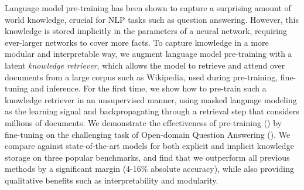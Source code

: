 Language model pre-training has been shown to capture a surprising amount of world knowledge, crucial for NLP tasks such as question answering. However, this knowledge is stored implicitly in the parameters of a neural network, requiring ever-larger networks to cover more facts.
To capture knowledge in a more modular and interpretable way, we augment language model pre-training with a latent {\em knowledge retriever}, which allows the model to retrieve and attend over documents from a large corpus such as Wikipedia, used during pre-training, fine-tuning and inference. For the first time, we show how to pre-train such a knowledge retriever in an unsupervised manner, using masked language modeling as the learning signal and backpropagating through a retrieval step that considers millions of documents.
We demonstrate the effectiveness of \thefullname pre-training (\thename) by fine-tuning on the challenging task of Open-domain Question Answering (\openqa). We compare against state-of-the-art models for both explicit and implicit knowledge storage on three popular \openqa benchmarks, and find that we outperform all previous methods by a significant margin (4-16\% absolute accuracy), while also providing qualitative benefits such as interpretability and modularity.
